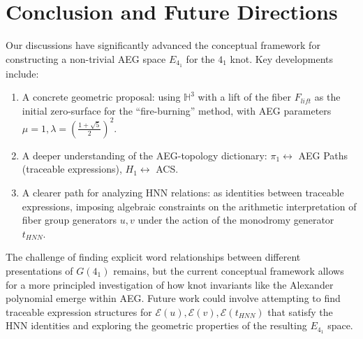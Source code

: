 \documentclass[12pt, a4paper]{article}
\begin{document}
\section{Conclusion and Future Directions}
Our discussions have significantly advanced the conceptual framework for constructing a non-trivial AEG space $E_{4_1}$ for the $4_1$ knot. Key developments include:
\begin{enumerate}
    \item A concrete geometric proposal: using $\mathbb{H}^3$ with a lift of the fiber $F_{lift}$ as the initial zero-surface for the ``fire-burning'' method, with AEG parameters $\mu=1, \lambda=\left(\frac{1+\sqrt{5}}{2}\right)^2$.
    \item A deeper understanding of the AEG-topology dictionary: $\pi_1 \leftrightarrow$ AEG Paths (traceable expressions), $H_1 \leftrightarrow$ ACS.
    \item A clearer path for analyzing HNN relations: as identities between traceable expressions, imposing algebraic constraints on the arithmetic interpretation of fiber group generators $u,v$ under the action of the monodromy generator $t_{HNN}$.
\end{enumerate}
The challenge of finding explicit word relationships between different presentations of $G(4_1)$ remains, but the current conceptual framework allows for a more principled investigation of how knot invariants like the Alexander polynomial emerge within AEG. Future work could involve attempting to find traceable expression structures for $\mathcal{E}(u), \mathcal{E}(v), \mathcal{E}(t_{HNN})$ that satisfy the HNN identities and exploring the geometric properties of the resulting $E_{4_1}$ space.
\end{document}
